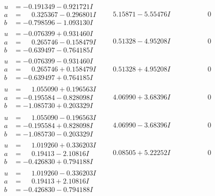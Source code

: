 \documentclass[1p]{elsarticle_modified}
\theoremstyle{definition}
\begin{document}
$$\begin{array}{c|c|c}
\begin{aligned}
u &= -0.191349 - 0.921721 I \\
a &= \phantom{-}0.325367 - 0.296801 I \\
b &= -0.798596 - 1.093130 I\end{aligned}
 & \phantom{-}5.15871 - 5.55476 I & \phantom{-0.000000 } 0 \\ \hline\begin{aligned}
u &= -0.076399 + 0.931460 I \\
a &= \phantom{-}0.265746 - 0.158479 I \\
b &= -0.639497 - 0.764185 I\end{aligned}
 & \phantom{-}0.51328 - 4.95208 I & \phantom{-0.000000 } 0 \\ \hline\begin{aligned}
u &= -0.076399 - 0.931460 I \\
a &= \phantom{-}0.265746 + 0.158479 I \\
b &= -0.639497 + 0.764185 I\end{aligned}
 & \phantom{-}0.51328 + 4.95208 I & \phantom{-0.000000 } 0 \\ \hline\begin{aligned}
u &= \phantom{-}1.055090 + 0.196563 I \\
a &= -0.195584 - 0.828098 I \\
b &= -1.085730 + 0.203329 I\end{aligned}
 & \phantom{-}4.06990 + 3.68396 I & \phantom{-0.000000 } 0 \\ \hline\begin{aligned}
u &= \phantom{-}1.055090 - 0.196563 I \\
a &= -0.195584 + 0.828098 I \\
b &= -1.085730 - 0.203329 I\end{aligned}
 & \phantom{-}4.06990 - 3.68396 I & \phantom{-0.000000 } 0 \\ \hline\begin{aligned}
u &= \phantom{-}1.019260 + 0.336203 I \\
a &= \phantom{-}0.19413 - 2.10816 I \\
b &= -0.426830 + 0.794188 I\end{aligned}
 & \phantom{-}0.08505 + 5.22252 I & \phantom{-0.000000 } 0 \\ \hline\begin{aligned}
u &= \phantom{-}1.019260 - 0.336203 I \\
a &= \phantom{-}0.19413 + 2.10816 I \\
b &= -0.426830 - 0.794188 I\end{aligned}

\end{array}$$
\end{document}
